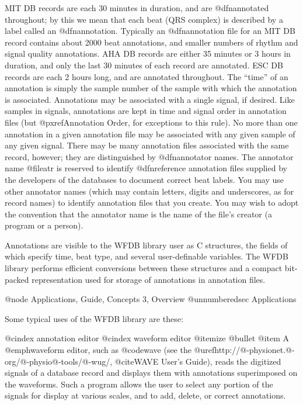 MIT DB records are each 30 minutes in duration, and are @dfn{annotated}
throughout; by this we mean that each beat (QRS complex) is described by
a label called an @dfn{annotation}.  Typically an @dfn{annotation file}
for an MIT DB record contains about 2000 beat annotations, and smaller
numbers of rhythm and signal quality annotations.  AHA DB records are
either 35 minutes or 3 hours in duration, and only the last 30 minutes
of each record are annotated.  ESC DB records are each 2 hours long, and
are annotated throughout.  The ``time'' of an annotation is simply the
sample number of the sample with which the annotation is associated.
Annotations may be associated with a single signal, if desired.  Like
samples in signals, annotations are kept in time and signal order in
annotation files (but @pxref{Annotation Order}, for exceptions to this
rule).  No more than one annotation in a given annotation file may be
associated with any given sample of any given signal.  There may be many
annotation files associated with the same record, however; they are
distinguished by @dfn{annotator names}.  The annotator name @file{atr}
is reserved to identify @dfn{reference annotation files} supplied by the
developers of the databases to document correct beat labels.  You may
use other annotator names (which may contain letters, digits and
underscores, as for record names) to identify annotation files that you
create.  You may wish to adopt the convention that the annotator name is
the name of the file's creator (a program or a person).

Annotations are visible to the WFDB library user as C structures, the
fields of which specify time, beat type, and several user-definable
variables.  The WFDB library performs efficient conversions between these
structures and a compact bit-packed representation used for storage of
annotations in annotation files.

@node     Applications, Guide, Concepts 3, Overview
@unnumberedsec Applications

Some typical uses of the WFDB library are these:

@cindex annotation editor
@cindex waveform editor
@itemize @bullet
@item
A @emph{waveform editor}, such as @code{wave} (see the
@uref{http://@-physionet.@-org/@-physio@-tools/@-wug/,
@cite{WAVE User's Guide}}), reads the
digitized signals of a database record and displays them with
annotations superimposed on the waveforms.  Such a program allows the
user to select any portion of the signals for display at various scales,
and to add, delete, or correct annotations.

